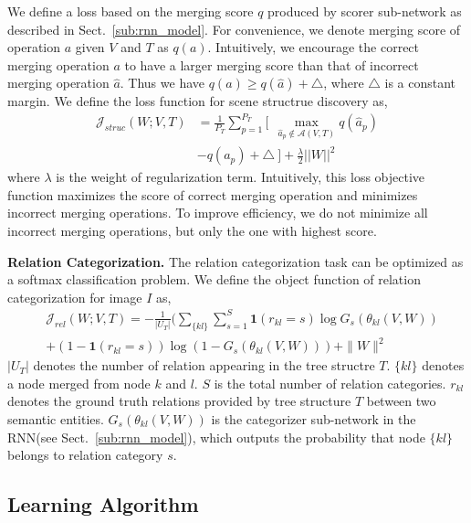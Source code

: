 \documentclass[10pt,twocolumn,letterpaper]{article}
\begin{document}
We define a loss based on the merging score $q$ produced by scorer sub-network as described in Sect.~\ref{sub:rnn_model}. For convenience, we denote merging score of operation $a$ given $V$ and $T$ as $q(a)$. Intuitively, we encourage the correct merging operation $a$ to have a larger merging score than that of incorrect merging operation $\widehat{a}$. Thus we have $q(a)\geq q(\widehat{a}) + \triangle$, where $\triangle$ is a constant margin. We define the loss function for scene structrue discovery as,
\vspace{-1mm}
\begin{equation}\label{eq_structure_loss}
\begin{split}
\mathcal{J}_{struc}(W;V,T) & =  \frac{1}{P_T} \sum_{p=1}^{P_T} [ \:\: \max_{\widehat{a}_p\notin\mathcal{A}(V,T)}
q(\widehat{a}_p)\\
& - q(a_p) + \triangle \:] + \frac{\lambda}{2}||W||^2
\end{split}
\end{equation}
where $\lambda$ is the weight of regularization term. Intuitively, this loss objective function maximizes the score of correct merging operation and minimizes incorrect merging operations. To improve efficiency, we do not minimize all incorrect merging operations, but only the one with highest score.


\textbf{Relation Categorization.}
The relation categorization task can be optimized as a softmax classification problem. We define the object function of relation categorization for image $I$ as,
\begin{equation}\label{eq_relation_loss}
\begin{split}
& \mathcal{J}_{rel}(W;V,T) = -\frac{1}{|U_T|}(  \sum_{\{kl\}} \sum_{s=1}^S \textbf{1}(r_{kl}=s)\log G_s(\theta_{kl}(V,W))  \\
& +(1-\textbf{1}(r_{kl}=s))\log(1-G_s(\theta_{kl}(V,W))  ) + \|W\|^2
\end{split}
\end{equation}
$|U_T|$ denotes the number of relation appearing in the tree structre $T$. $\{kl\}$ denotes a node merged from node $k$ and $l$. $S$ is the total number of relation categories. $r_{kl}$ denotes the ground truth relations provided by tree structure $T$ between two semantic entities. $G_s(\theta_{kl}(V,W))$ is the categorizer sub-network in the RNN(see Sect.~\ref{sub:rnn_model}), which outputs the probability that node $\{kl\}$ belongs to relation category $s$.

\subsection{Learning Algorithm} \label{sub:em_learning}
\end{document}
